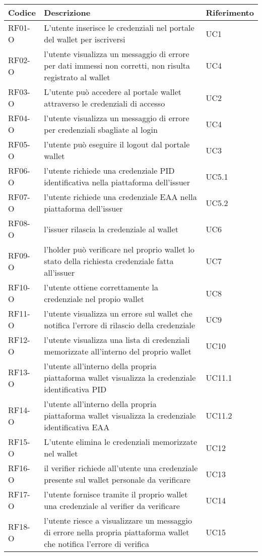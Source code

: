     \begin{tabular}{|p{}|p{}|p{}|}
        \hline
        \textbf{Codice} & \textbf{Descrizione} & \textbf{Riferimento} \\
        \hline
        RF01-O & L'utente inserisce le credenziali nel portale del wallet per iscriversi & UC1\\
        RF02-O & l'utente visualizza un messaggio di errore per dati immessi non corretti, non risulta registrato al wallet & UC4\\
        RF03-O & L'utente può accedere al portale wallet attraverso le credenziali di accesso & UC2\\
        RF04-O & l'utente visualizza un messaggio di errore per credenziali sbagliate al login & UC4\\ 
        RF05-O & l'utente può eseguire il logout dal portale wallet & UC3\\
        RF06-O & l'utente richiede una credenziale PID identificativa nella piattaforma dell'issuer & UC5.1\\
        RF07-O & l'utente richiede una credenziale EAA nella piattaforma dell'issuer & UC5.2\\
        RF08-O & l'issuer rilascia la credenziale al wallet & UC6\\
        RF09-O & l'holder può verificare nel proprio wallet lo stato della richiesta credenziale fatta all'issuer & UC7\\
        RF10-O & l'utente ottiene correttamente la credenziale nel propio wallet & UC8\\
        RF11-O & l'utente visualizza un errore sul wallet che notifica l'errore di rilascio della credenziale & UC9\\
        RF12-O & l'utente visualizza una lista di credenziali memorizzate all'interno del proprio wallet& UC10\\
        RF13-O & l'utente all'interno della propria piattaforma wallet visualizza la credenziale identificativa PID & UC11.1\\
        RF14-O & l'utente all'interno della propria piattaforma wallet visualizza la credenziale identificativa EAA & UC11.2\\
        RF15-O & L'utente elimina le credenziali memorizzate nel wallet & UC12\\
        RF16-O & il verifier richiede all'utente una credenziale presente sul wallet personale da verificare & UC13\\
        RF17-O & l'utente fornisce tramite il proprio wallet una credenziale al verifier da verificare & UC14\\
        RF18-O & l'utente riesce a visualizzare un messaggio di errore nella propria piattaforma wallet che notifica l'errore di verifica & UC15\\
        \hline
    \end{tabular}
